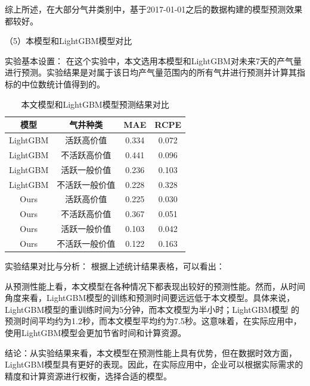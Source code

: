 综上所述，在大部分气井类别中，基于2017-01-01之后的数据构建的模型预测效果都较好。

（5）本模型和LightGBM模型对比

实验基本设置： 在这个实验中，本文选用本模型和LightGBM对未来7天的产气量进行预测。实验结果是对属于该日均产气量范围内的所有气井进行预测并计算其指标的中位数统计值得到的。
\begin{table}[H]
    \renewcommand{\arraystretch}{1.5}
    \centering
    \caption{本文模型和LightGBM模型预测结果对比}
    \label{tab:prediction_comparison}
    \begin{tabular}{|c|c|c|c|}
    \hline
    模型     & 气井种类 & MAE & RCPE \\ \hline
    LightGBM & 活跃高价值       &0.334            & 0.072 \\ \hline
    LightGBM & 不活跃高价值     & 0.441           & 0.096    \\ \hline
    LightGBM & 活跃一般价值      & 0.236           & 0.103    \\ \hline
    LightGBM & 不活跃一般价值      & 0.228           & 0.328    \\ \hline
    Ours      & 活跃高价值        &0.225            &0.030      \\ \hline
    Ours      & 不活跃高价值      & 0.367           & 0.051   \\ \hline
    Ours      & 活跃一般价值      & 0.103           & 0.042    \\ \hline
    Ours      &不活跃一般价值      & 0.122           & 0.163    \\ \hline
    \end{tabular}
\end{table}

实验结果对比与分析： 根据上述统计结果表格，可以看出：

从预测性能上看，本文模型在各种情况下都表现出较好的预测性能。然而，从时间角度来看，LightGBM模型的训练和预测时间要远远低于本文模型。具体来说，LightGBM模型的重训练时间为5分钟，而本文模型为半小时；LightGBM模型
的预测时间平均约为1.2秒，而本文模型平均约为7.5秒。这意味着，在实际应用中，使用LightGBM模型会更加节省时间和计算资源。

结论：从实验结果来看，本文模型在预测性能上具有优势，但在数据时效方面，LightGBM模型具有更好的表现。因此，在实际应用中，企业可以根据实际需求的精度和计算资源进行权衡，选择合适的模型。
